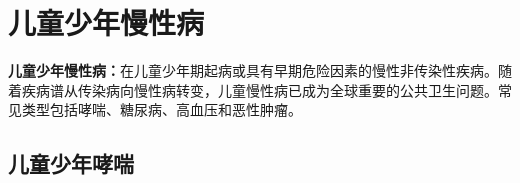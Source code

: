 \chapter{儿童少年慢性病}
\setcounter{chapter}{9}

\begin{defbox}
\textbf{儿童少年慢性病：}在儿童少年期起病或具有早期危险因素的慢性非传染性疾病。随着疾病谱从传染病向慢性病转变，儿童慢性病已成为全球重要的公共卫生问题。常见类型包括哮喘、糖尿病、高血压和恶性肿瘤。
\end{defbox}

\section{儿童少年哮喘}

